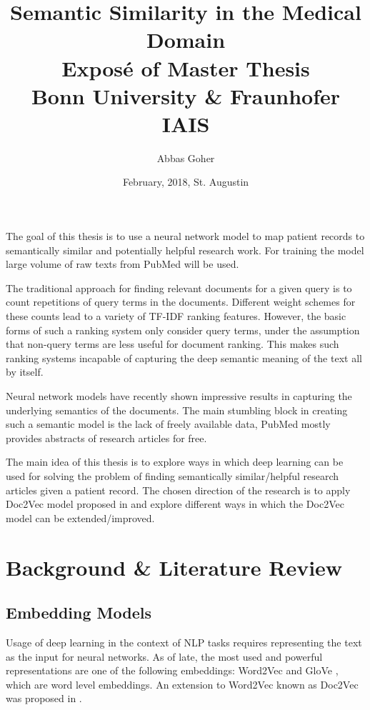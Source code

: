 \documentclass[12pt,a4paper] {article}
\begin{document}
	
	\title{Semantic Similarity in the Medical Domain \\ \hphantom \newline
		\large     Expos\'{e} of Master Thesis
		\\Bonn University \& Fraunhofer IAIS}
	\author{Abbas Goher}
	\date{February, 2018, St. Augustin}
	\maketitle
	
	The goal of this thesis is to use a neural network model to map patient records to semantically similar and potentially helpful research work. For training the model large volume of raw texts from PubMed \cite{pubmed}  will be used.
	
	
	The traditional approach for finding relevant documents for a given query is to count repetitions of query terms in the documents. Different weight schemes for these counts lead to a variety of TF-IDF ranking features. However, the basic forms of such a ranking system only consider query terms, under the assumption that non-query terms are less useful for document ranking. This makes such ranking systems incapable of capturing the deep semantic meaning of the text all by itself. 
	
	Neural network models have recently shown impressive results in capturing the underlying semantics of the documents\cite{Bengio2006}.
	The main stumbling block in creating such a semantic model is the lack of freely available data, PubMed mostly provides abstracts of research articles for free. 
	
	The main idea of this thesis is to explore ways in which deep learning can be used for solving the problem of finding semantically similar/helpful research articles given a patient record. The chosen direction of the research is to apply Doc2Vec model proposed in \cite{le2014distributed} and explore different ways in which the Doc2Vec model can be extended/improved.
	
	\section*{Background \& Literature Review}
	
	\subsection*{Embedding Models}
	Usage of deep learning in the context of NLP tasks requires representing the text as the input for neural networks. As of late, the most used and powerful representations are one of the following embeddings: Word2Vec \cite{mikolov2013efficient} and GloVe \cite{pennington2014glove}, which are word level embeddings. An extension to Word2Vec known as Doc2Vec was proposed in \cite{le2014distributed}.  
	
\end{document}
